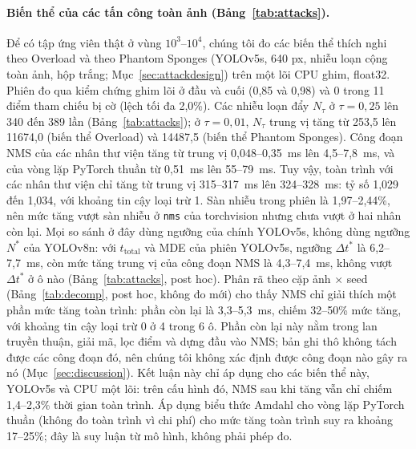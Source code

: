\documentclass[a4paper,fleqn]{cas-dc}
\newcommand{\Ntau}{N_{\tau}}
\begin{document}
\paragraph{Biến thể của các tấn công toàn ảnh (Bảng~\ref{tab:attacks}).}
\label{sec:attacks}
Để có tập ứng viên thật ở vùng $10^3$--$10^4$, chúng tôi đo các biến thể thích nghi theo Overload và theo Phantom Sponges (YOLOv5s, 640 px, nhiễu loạn cộng toàn ảnh, hộp trắng; Mục~\ref{sec:attackdesign}) trên một lõi CPU ghim, float32. Phiên đo qua kiểm chứng ghim lõi ở đầu và cuối (0,85 và 0,98) và 0 trong 11 điểm tham chiếu bị cờ (lệch tối đa 2,0\%). Các nhiễu loạn đẩy $\Ntau$ ở $\tau=0{,}25$ lên 340 đến 389 lần (Bảng~\ref{tab:attacks}); ở $\tau=0{,}01$, $\Ntau$ trung vị tăng từ 253,5 lên 11674,0 (biến thể Overload) và 14487,5 (biến thể Phantom Sponges). Công đoạn NMS của các nhân thư viện tăng từ trung vị 0,048--0,35~ms lên 4,5--7,8~ms, và của vòng lặp PyTorch thuần từ 0,51~ms lên 55--79~ms. Tuy vậy, toàn trình với các nhân thư viện chỉ tăng từ trung vị 315--317~ms lên 324--328~ms: tỷ số 1,029 đến 1,034, với khoảng tin cậy loại trừ 1. Sàn nhiễu trong phiên là 1,97--2,44\%, nên mức tăng vượt sàn nhiễu ở \texttt{nms} của torchvision nhưng chưa vượt ở hai nhân còn lại. Mọi so sánh ở đây dùng ngưỡng của chính YOLOv5s, không dùng ngưỡng $N^{*}$ của YOLOv8n: với $t_{\mathrm{total}}$ và MDE của phiên YOLOv5s, ngưỡng $\Delta t^{*}$ là 6,2--7,7~ms, còn mức tăng trung vị của công đoạn NMS là 4,3--7,4~ms, không vượt $\Delta t^{*}$ ở ô nào (Bảng~\ref{tab:attacks}, post hoc). Phân rã theo cặp ảnh $\times$ seed (Bảng~\ref{tab:decomp}, post hoc, không đo mới) cho thấy NMS chỉ giải thích một phần mức tăng toàn trình: phần còn lại là 3,3--5,3~ms, chiếm 32--50\% mức tăng, với khoảng tin cậy loại trừ 0 ở 4 trong 6 ô. Phần còn lại này nằm trong lan truyền thuận, giải mã, lọc điểm và dựng đầu vào NMS; bản ghi thô không tách được các công đoạn đó, nên chúng tôi không xác định được công đoạn nào gây ra nó (Mục~\ref{sec:discussion}). Kết luận này chỉ áp dụng cho các biến thể này, YOLOv5s và CPU một lõi: trên cấu hình đó, NMS sau khi tăng vẫn chỉ chiếm 1,4--2,3\% thời gian toàn trình. Áp dụng biểu thức Amdahl cho vòng lặp PyTorch thuần (không đo toàn trình vì chi phí) cho mức tăng toàn trình suy ra khoảng 17--25\%; đây là suy luận từ mô hình, không phải phép đo.
\end{document}
